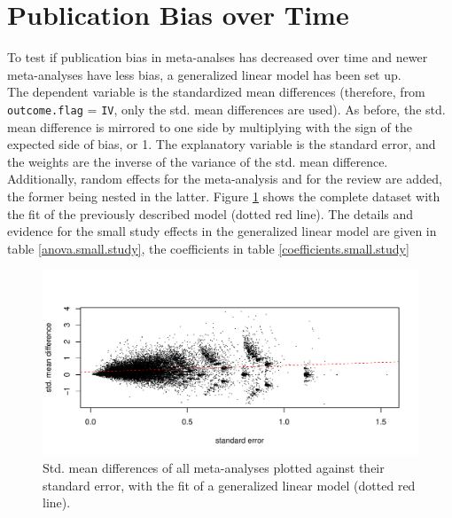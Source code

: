 \documentclass[11pt,a4paper,twoside]{book}\usepackage[]{graphicx}\usepackage[]{color}
\newenvironment{knitrout}{}{} %
\begin{document}
\section{Publication Bias over Time}
To test if publication bias in meta-analses has decreased over time and newer meta-analyses have less bias, a generalized linear model has been set up. \\
The dependent variable is the standardized mean differences (therefore, from \texttt{outcome.flag} = \texttt{IV}, only the std. mean differences are used). As before, the std. mean difference is mirrored to one side by multiplying with the sign of the expected side of bias,  or 1. The explanatory variable is the standard error, and the weights are the inverse of the variance of the std. mean difference. Additionally, random effects for the meta-analysis and for the review are added, the former being nested in the latter. Figure \ref{fig:smds} shows the complete dataset with the fit of the previously described model (dotted red line). The details and evidence for the small study effects in the generalized linear model are given in table \ref{anova.small.study}, the coefficients in table \ref{coefficients.small.study}

\begin{figure}
\begin{knitrout}
\color{fgcolor}

{\centering \includegraphics[width=\textwidth-3cm]{figure/ch03_figunnamed-chunk-29-1} 

}



\end{knitrout}
\caption{Std. mean differences of all meta-analyses plotted against their standard error, with the fit of a generalized linear model (dotted red line).}
\label{fig:smds}
\end{figure}
\end{document}
